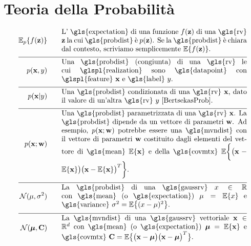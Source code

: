 \newpage
\section*{Teoria della Probabilità} 
\begin{align}
	\expect_{p} \{ f(\datapoint) \}  \quad\quad & \parbox{.75\textwidth}{L' \gls{expectation} di una funzione $f(\datapoint)$ di una \gls{rv} 
		$\datapoint$ la cui \gls{probdist} è $\prob{\datapoint}$. Se la \gls{probdist} è chiara dal contesto, scriviamo semplicemente $\expect \{ f(\datapoint) \}$. }  \nonumber \\[2mm] \hline \nonumber\\[-5mm]    
	\prob{\featurevec,\truelabel} \quad\quad & \parbox{.75\textwidth}{Una \gls{probdist} (congiunta) di una \gls{rv} 
		le cui \glspl{realization} sono \gls{datapoint} con \glspl{feature} $\featurevec$ e \gls{label} $\truelabel$.} \nonumber        \nonumber \\[2mm] \hline \nonumber\\[-5mm]        
	\prob{\featurevec|\truelabel} \quad\quad & \parbox{.75\textwidth}{Una \gls{probdist} condizionata di una \gls{rv} 
		$\featurevec$, dato il valore di un'altra \gls{rv} $\truelabel$ \cite[Sec.\ 3.5]{BertsekasProb}. } \nonumber       \nonumber \\[2mm] \hline \nonumber\\[-5mm]           
	\prob{\featurevec;\weights} \quad\quad & \parbox{.75\textwidth}{Una \gls{probdist} parametrizzata di una \gls{rv} $\featurevec$. 
		La \gls{probdist} dipende da un vettore di parametri $\weights$. Ad esempio, $\prob{\featurevec;\weights}$ potrebbe essere una
		\gls{mvndist} con il vettore di parametri $\weights$ costituito dagli elementi del vettore di \gls{mean} $\expect \{ \featurevec \}$ 
		e della \gls{covmtx} $\expect \bigg \{ \big( \featurevec - \expect \{ \featurevec \}\big) \big( \featurevec - \expect \{ \featurevec \}\big)^{T}  \bigg\}$.} \nonumber           \nonumber \\[2mm] \hline \nonumber\\[-5mm]
	\mathcal{N}(\mu, \sigma^{2}) \quad\quad & \parbox{.75\textwidth}{La \gls{probdist} di una 
		\gls{gaussrv} $\feature \in \mathbb{R}$ con \gls{mean} (o \gls{expectation}) $\mu= \expect \{ \feature \}$ 
		e \gls{variance} $\sigma^{2} =   \expect \big\{  (  \feature - \mu )^2 \big\}$.} \nonumber    \nonumber \\[2mm] \hline \nonumber\\[-5mm]
	\mathcal{N}(\clustermean, \mathbf{C}) \quad\quad & \parbox{.75\textwidth}{La \gls{mvndist} di una		\gls{gaussrv} vettoriale $\featurevec \in \mathbb{R}^{\featuredim}$ con \gls{mean} (o \gls{expectation}) $\clustermean= \expect \{ \featurevec \}$ 
		e \gls{covmtx} $\mathbf{C} =  \expect \big\{ \big( \featurevec - \clustermean \big)\big( \featurevec - \clustermean \big)^{T} \big\}$.} \nonumber                                             
\end{align}





